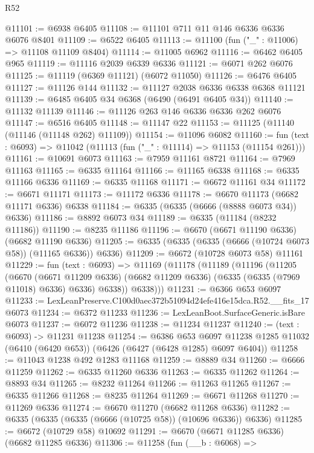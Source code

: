 \begin{lexlean}{R52}
\begin{coremodule}
@11101 := @6938 @6405
@11108 := @11101 @711 @11 @146 @6336 @6336 @6076 @8401
@11109 := @6522 @6405
@11113 := @11100 (fun ("_" : @11006) => @11108 @11109 @8404)
@11114 := @11005 @6962
@11116 := @6462 @6405 @965
@11119 := @11116 @2039 @6339 @6336
@11121 := @6071 @262 @6076
@11125 := @11119 (@6369 @11121) (@6072 @11050)
@11126 := @6476 @6405
@11127 := @11126 @144
@11132 := @11127 @2038 @6336 @6338 @6368 @11121
@11139 := @6485 @6405 @34 @6368 (@6490 (@6491 @6405 @34))
@11140 := @11132 @11139
@11146 := @11126 @263 @146 @6336 @6336 @262 @6076
@11147 := @6516 @6405
@11148 := @11147 @22
@11153 := @11125 (@11140 (@11146 (@11148 @262) @11109))
@11154 := @11096 @6082
@11160 := fun (text : @6093) => @11042 (@11113 (fun ("_" : @11114) => @11153 (@11154 @261)))
@11161 := @10691 @6073
@11163 := @7959 @11161 @8721
@11164 := @7969 @11163
@11165 := @6335 @11164
@11166 := @11165 @6338
@11168 := @6335 @11166 @6336
@11169 := @6335 @11168
@11171 := @6672 @11161 @34
@11172 := @6671 @11171
@11173 := @11172 @6336
@11178 := @6670 @11173 (@6682 @11171 @6336) @6338
@11184 := @6335 (@6335 (@6666 (@8888 @6073 @34)) @6336)
@11186 := @8892 @6073 @34
@11189 := @6335 (@11184 (@8232 @11186))
@11190 := @8235 @11186
@11196 := @6670 (@6671 @11190 @6336) (@6682 @11190 @6336)
@11205 := @6335 (@6335 (@6335 (@6666 (@10724 @6073 @58)) (@11165 @6336)) @6336)
@11209 := @6672 (@10728 @6073 @58) @11161
@11229 := fun (text : @6093) =>
  @11169
    (@11178
      (@11189
        (@11196
          (@11205
            (@6670
              (@6671 @11209 @6336)
              (@6682 @11209 @6336)
              (@6335 (@6335 (@7969 @11018) @6336) @6336)
              @6338))
          @6338)))
@11231 := @6366 @653 @6097
@11233 := LexLeanPreserve.C100d0aec372b51094d24efe416e15dca.R52.__fits_17 @6073
@11234 := @6372 @11233
@11236 := LexLeanBoot.SurfaceGeneric.isBare @6073
@11237 := @6072 @11236
@11238 := @11234 @11237
@11240 := (text : @6093) -> @11231 @11238
@11254 := @6386
    @653
    @6097
    @11238
    @1285
    @11032
    (@6410 (@6420 @653))
    (@6426 (@6427 (@6428 @1285) @6097 @6404))
@11258 := @11043 @1238 @492 @1283 @11168
@11259 := @8889 @34
@11260 := @6666 @11259
@11262 := @6335 @11260 @6336
@11263 := @6335 @11262
@11264 := @8893 @34
@11265 := @8232 @11264
@11266 := @11263 @11265
@11267 := @6335 @11266
@11268 := @8235 @11264
@11269 := @6671 @11268
@11270 := @11269 @6336
@11274 := @6670 @11270 (@6682 @11268 @6336)
@11282 := @6335 (@6335 (@6335 (@6666 (@10725 @58)) (@10696 @6336)) @6336)
@11285 := @6672 (@10729 @58) @10692
@11291 := @6670 (@6671 @11285 @6336) (@6682 @11285 @6336)
@11306 := @11258
    (fun (__b : @6068) =>

\end{coremodule}
\end{lexlean}
